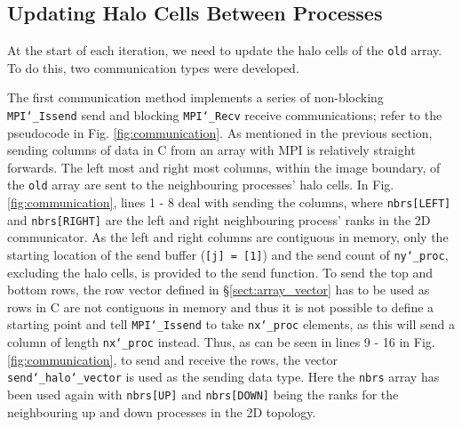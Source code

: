 \documentclass[11pt, a4paper]{article}
\begin{document}
		\subsection{Updating Halo Cells Between Processes}
			At the start of each iteration, we need to update the halo cells of the \texttt{old} array. To do this, two communication types were developed.
			
			The first communication method implements a series of non-blocking \texttt{MPI\char`_Issend} send and blocking \texttt{MPI\char`_Recv} receive communications; refer to the pseudocode in Fig. \ref{fig:communication}. As mentioned in the previous section, sending columns of data in C from an array with MPI is relatively straight forwards. The left most and right most columns, within the image boundary, of the \texttt{old} array are sent to the neighbouring processes' halo cells. In Fig. \ref{fig:communication}, lines 1 - 8 deal with sending the columns, where \texttt{nbrs[LEFT]} and \texttt{nbrs[RIGHT]} are the left and right neighbouring process' ranks in the 2D communicator. As the left and right columns are contiguous in memory, only the starting location of the send buffer (\texttt{[j] = [1]}) and the send count of \texttt{ny\char`_proc}, excluding the halo cells, is provided to the send function. To send the top and bottom rows,  the row vector defined in \S\ref{sect:array_vector}  has to be used as rows in C are not contiguous in memory and thus it is not possible to define a starting point and tell \texttt{MPI\char`_Issend} to take \texttt{nx\char`_proc} elements, as this will send a column of length \texttt{nx\char`_proc} instead. Thus, as can be seen in lines 9 - 16 in Fig. \ref{fig:communication}, to send and receive the rows, the vector \texttt{send\char`_halo\char`_vector} is used as the sending data type. Here the \texttt{nbrs} array has been used again with \texttt{nbrs[UP]} and \texttt{nbrs[DOWN]} being the ranks for the neighbouring up and down processes in the 2D topology.
						
\end{document}
